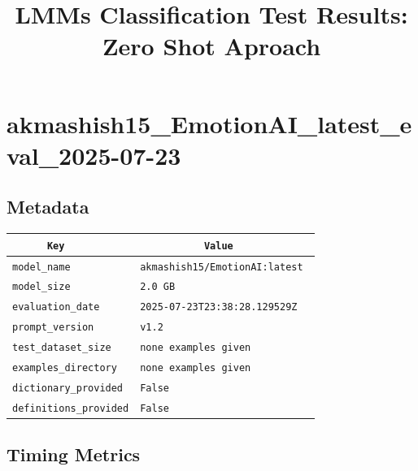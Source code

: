\documentclass{article}
\begin{document}
\title{LMMs Classification Test Results: Zero Shot Aproach}\n\maketitle\n\n\section{akmashish15\_EmotionAI\_latest\_eval\_2025-07-23}
\subsection{Metadata}

\begin{center}
\begin{tabular}{l | l} \hline
    \verb|      Key      | & \verb|           Value           | \\ \hline
    \hline
    \verb|model_name    | & \verb|akmashish15/EmotionAI:latest | \\ \hline
    \verb|model_size    | & \verb|2.0 GB                       | \\ \hline
    \verb|evaluation_date| & \verb|2025-07-23T23:38:28.129529Z  | \\ \hline
    \verb|prompt_version| & \verb|v1.2                         | \\ \hline
    \verb|test_dataset_size| & \verb|none examples given          | \\ \hline
    \verb|examples_directory| & \verb|none examples given          | \\ \hline
    \verb|dictionary_provided| & \verb|False                        | \\ \hline
    \verb|definitions_provided| & \verb|False                        | \\ \hline
\end{tabular}
\end{center}

\subsection{Timing Metrics}
\end{document}
